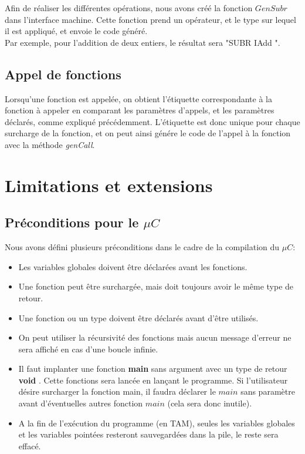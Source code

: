 \documentclass[11pt,a4paper]{report}
\begin{document}
Afin de réaliser les différentes opérations, nous avons créé la fonction 
$GenSubr$ dans l'interface machine. Cette fonction prend un opérateur, et le type sur lequel il est appliqué, et envoie le code généré. \\
Par exemple, pour l'addition de deux entiers, le résultat sera "SUBR IAdd ".

\subsection{Appel de fonctions}

Lorsqu'une fonction est appelée, on obtient l'étiquette correspondante à la fonction à appeler en comparant les paramètres d'appels, et les paramètres déclarés, comme expliqué précédemment. 
L'étiquette est donc unique pour chaque surcharge de la fonction, et on peut ainsi génére le code de l'appel à la fonction avec la méthode \textsl{genCall}.


\section{Limitations et extensions}

\subsection{Préconditions pour le $\mu C$}

Nous avons défini plusieurs préconditions dans le cadre de la compilation du $\mu C$:
\begin{itemize}
\item Les variables globales doivent être déclarées avant les fonctions.
\item Une fonction peut être surchargée, mais doit toujours avoir le même type de retour.
\item Une fonction ou un type doivent être déclarés avant d'être utilisés.
\item On peut utiliser la récursivité des fonctions mais aucun message d'erreur ne sera affiché en cas d'une boucle infinie.
\item Il faut implanter une fonction \textbf{main}  sans argument avec un type de retour \textbf{void} . Cette fonctions sera lancée en lançant le programme. Si l'utilisateur désire surcharger la fonction main, il faudra déclarer le $main$ sans paramètre avant d'éventuelles autres fonction $main$ (cela sera donc inutile).
\item A la fin de l'exécution du programme (en TAM), seules les variables globales et les variables pointées resteront sauvegardées dans la pile, le reste sera effacé.
\end{itemize}
\end{document}
